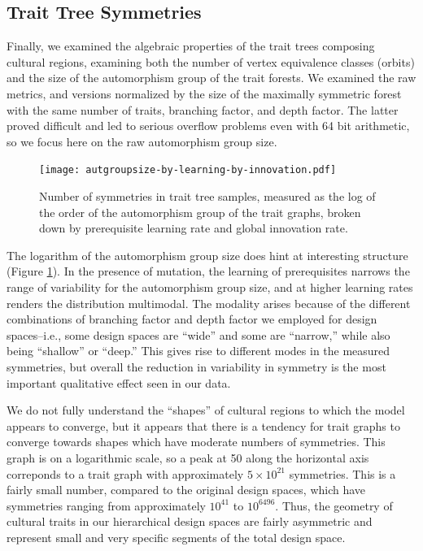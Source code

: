 \documentclass[referee,graybox,natbib]{svmult}
\begin{document}
\subsection{Trait Tree Symmetries}\label{trait-tree-symmetries}

Finally, we examined the algebraic properties of the trait trees
composing cultural regions, examining both the number of vertex
equivalence classes (orbits) and the size of the automorphism group of
the trait forests. We examined the raw metrics, and versions normalized
by the size of the maximally symmetric forest with the same number of
traits, branching factor, and depth factor. The latter proved difficult
and led to serious overflow problems even with 64 bit arithmetic, so we
focus here on the raw automorphism group size.

\begin{figure}[h] 
\centering 
\texttt{[image: autgroupsize-by-learning-by-innovation.pdf]} 
\caption{Number of symmetries in trait tree samples, measured as the log of the order of the automorphism group of the trait graphs, broken down by prerequisite learning rate and global innovation rate.} 
\label{img:autgsize} 
\end{figure}

The logarithm of the automorphism group size does hint at interesting
structure (Figure \ref{img:autgsize}). In the presence of mutation, the
learning of prerequisites narrows the range of variability for the
automorphism group size, and at higher learning rates renders the
distribution multimodal. The modality arises because of the different
combinations of branching factor and depth factor we employed for design
spaces--i.e., some design spaces are ``wide'' and some are ``narrow,''
while also being ``shallow'' or ``deep.'' This gives rise to different
modes in the measured symmetries, but overall the reduction in
variability in symmetry is the most important qualitative effect seen in
our data.

We do not fully understand the ``shapes'' of cultural regions to which
the model appears to converge, but it appears that there is a tendency
for trait graphs to converge towards shapes which have moderate numbers
of symmetries. This graph is on a logarithmic scale, so a peak at 50
along the horizontal axis correponds to a trait graph with approximately
$5 \times 10^{21}$ symmetries. This is a fairly small number, compared
to the original design spaces, which have symmetries ranging from
approximately $10^{41}$ to $10^{6496}$. Thus, the geometry of cultural
traits in our hierarchical design spaces are fairly asymmetric and
represent small and very specific segments of the total design space.
\end{document}
